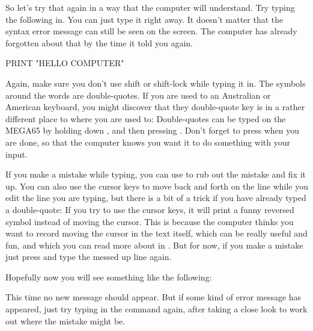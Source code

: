 \needspace{4cm} %

So let's try that again in a way that the computer will understand.  Try typing
  the following in.  You can just type it right away. It doesn't matter that the
  syntax error message can still be seen on the screen.  The computer has already
  forgotten about that by the time it told you  again.

\begin{screenoutput}
PRINT "HELLO COMPUTER"
\end{screenoutput}

Again, make sure you don't use shift or shift-lock while typing it in.  The symbols around
the words  are double-quotes.  If you are used to an Australian or American
keyboard, you might discover that they double-quote key is in a rather different place to
where you are used to:  Double-quotes can be typed on the MEGA65 by holding down
, and then pressing .  Don't forget to press 
when you are done, so that the computer knows you want it to do something with your input.

If you make a mistake while typing, you can use  to rub out the mistake
and fix it up.  You can also use the cursor keys to move back and forth on the line while
you edit the line you are typing, but there is a bit of a trick if you have already typed
a double-quote: If you try to use the cursor keys, it will print a funny reversed symbol
instead of moving the cursor.  This is because the computer thinks you want to record
moving the cursor in the text itself, which can be really useful and fun, and which you can
read more about in . But for now, if you
make a mistake just press  and type the messed up line again.

\needspace{4cm} %
Hopefully now you will see something like the following:


  This time no new  message should appear. But if some kind
  of error message has appeared, just try typing in the command again, after
  taking a close look to work out where the mistake might be.

